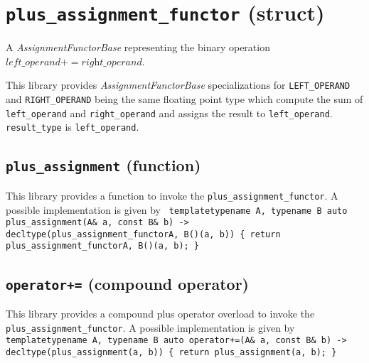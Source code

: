 \section{\texttt{plus\_assignment\_functor} (struct)}
A \textit{AssignmentFunctorBase} representing the binary operation $\textit{left\_operand} += \textit{right\_operand}$.\newline

\noindent{}This library provides \textit{AssignmentFunctorBase} specializations for
\texttt{LEFT\_OPERAND} and \texttt{RIGHT\_OPERAND} being the same    floating point
type which compute  the sum of  \texttt{left\_operand} and \texttt{right\_operand}
and assigns the result to \texttt{left\_operand}.
\texttt{result\_type} is \texttt{left\_operand}.

\subsection{\texttt{plus\_assignment} (function)}
This library provides a function to invoke the \texttt{plus\_assignment\_functor}.
A possible implementation is given by\newline
\texttt{
template\textlangle typename A, typename B\textrangle\newline
auto plus\_assignment(A\& a, const B\& b) -> decltype(plus\_assignment\_functor\textlangle A, B\textrangle()(a, b))\newline
\{ return plus\_assignment\_functor\textlangle A, B\textrangle()(a, b); \}
}

\subsection{\texttt{operator+=} (compound operator)}
This library provides a compound plus operator overload to invoke the \texttt{plus\_assignment\_functor}.
A possible implementation is given by\newline
\texttt{
template\textlangle typename A, typename B\textrangle\newline
auto operator+=(A\& a, const B\& b) -> decltype(plus\_assignment(a, b))\newline
\{ return plus\_assignment(a, b); \}
}
